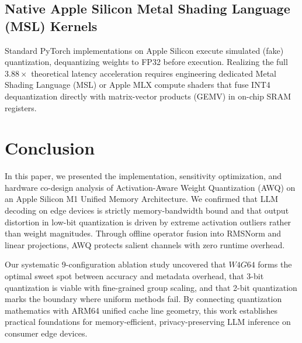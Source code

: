 \documentclass[conference]{IEEEtran}
\begin{document}
\subsection{Native Apple Silicon Metal Shading Language (MSL) Kernels}
Standard PyTorch implementations on Apple Silicon execute simulated (fake) quantization, dequantizing weights to FP32 before execution. Realizing the full $3.88\times$ theoretical latency acceleration requires engineering dedicated Metal Shading Language (MSL) or Apple MLX compute shaders that fuse INT4 dequantization directly with matrix-vector products (GEMV) in on-chip SRAM registers.

\section{Conclusion}
In this paper, we presented the implementation, sensitivity optimization, and hardware co-design analysis of Activation-Aware Weight Quantization (AWQ) on an Apple Silicon M1 Unified Memory Architecture. We confirmed that LLM decoding on edge devices is strictly memory-bandwidth bound and that output distortion in low-bit quantization is driven by extreme activation outliers rather than weight magnitudes. Through offline operator fusion into RMSNorm and linear projections, AWQ protects salient channels with zero runtime overhead.

Our systematic 9-configuration ablation study uncovered that $W4G64$ forms the optimal sweet spot between accuracy and metadata overhead, that 3-bit quantization is viable with fine-grained group scaling, and that 2-bit quantization marks the boundary where uniform methods fail. By connecting quantization mathematics with ARM64 unified cache line geometry, this work establishes practical foundations for memory-efficient, privacy-preserving LLM inference on consumer edge devices.
\end{document}

